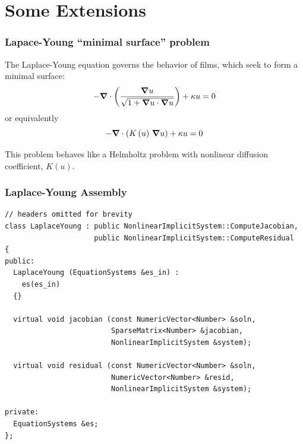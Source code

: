 \section{Some Extensions}
%





\frame
{
  \Large
  \begin{block}{}
  \end{block}
}

\frame
{
  \frametitle{Lapace-Young ``minimal surface'' problem}

  The Laplace-Young equation governs the behavior of films, which seek to form a minimal surface:
  \begin{equation*}
    -{\boldsymbol{\nabla}} {}\cdot\left(\frac{{\boldsymbol{\nabla}} {u}}{\sqrt{1 + {\boldsymbol{\nabla}} {u}\cdot{\boldsymbol{\nabla}} {u}}}\right) + \kappa u = 0
  \end{equation*}
  or equivalently
  \begin{equation*}
    -{\boldsymbol{\nabla}} {}\cdot\left(K\left(u\right)\,{\boldsymbol{\nabla}} {u}\right) + \kappa u = 0
  \end{equation*}
  
  This problem behaves like a Helmholtz problem with nonlinear diffusion coefficient, $K(u)$.
}

\begin{frame}
  \frametitle{Laplace-Young Assembly}
  \begin{lstlisting}
// headers omitted for brevity
class LaplaceYoung : public NonlinearImplicitSystem::ComputeJacobian,
                     public NonlinearImplicitSystem::ComputeResidual
{
public:  
  LaplaceYoung (EquationSystems &es_in) :
    es(es_in)
  {}

  virtual void jacobian (const NumericVector<Number> &soln,
                         SparseMatrix<Number> &jacobian,
                         NonlinearImplicitSystem &system);

  virtual void residual (const NumericVector<Number> &soln,
                         NumericVector<Number> &resid,
                         NonlinearImplicitSystem &system); 

private:
  EquationSystems &es;
};
  \end{lstlisting}
\end{frame}



